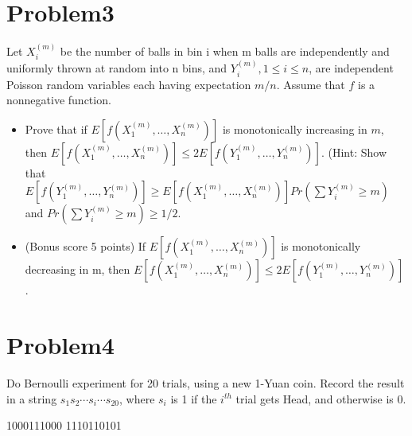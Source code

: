\documentclass[12pt]{article}
\begin{document}
\section{Problem3}
Let $X^{(m)}_i$ be the number of balls in bin i when m balls are independently and uniformly thrown at random into n bins, and $Y^{(m)}_i , 1 \le i \le n$, are independent Poisson random variables each having expectation $m/n$. Assume that $f$ is a nonnegative function.
\begin{itemize}
\item Prove that if $E[f(X_1^{(m)}, \dots, X_n^{(m)})]$ is monotonically increasing in $m$, then $E[f(X_1^{(m)}, \dots, X_n^{(m)})] \le 2E[f(Y_1^{(m)}, \dots, Y_n^{(m)})]$. (Hint: Show that $E[f(Y_1^{(m)}, \dots, Y_n^{(m)})] \ge E[f(X_1^{(m)}, \dots, X_n^{(m)})] Pr(\sum Y_i^{(m)} \ge m)$ and $Pr(\sum Y_i^{(m)} \ge m) \ge 1/2$.
\item (Bonus score 5 points) If $E[f(X_1^{(m)}, \dots, X_n^{(m)})]$ is monotonically decreasing in m, then $E[f(X_1^{(m)}, \dots, X_n^{(m)})] \le 2E[f(Y_1^{(m)}, \dots, Y_n^{(m)})]$.
\end{itemize}

\section{Problem4}
Do Bernoulli experiment for 20 trials, using a new 1-Yuan coin. Record the result in a
string $s_1s_2 \cdots s_i \cdots s_{20}$, where $s_i$ is 1 if the $i^{th}$ trial gets Head, and otherwise is 0.

1000111000 1110110101
\end{document}
